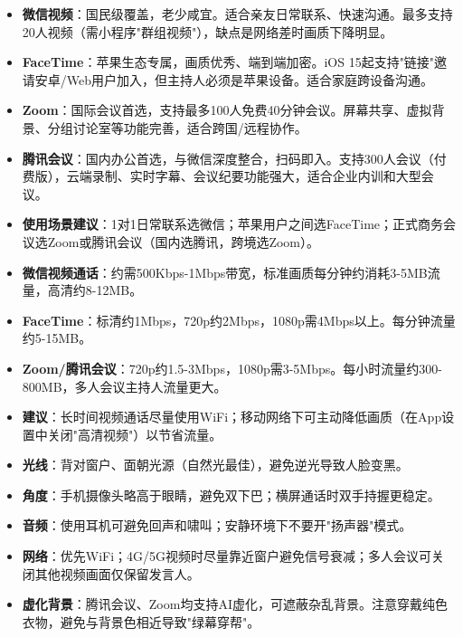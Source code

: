 \begin{itemize}
  \item \textbf{微信视频}：国民级覆盖，老少咸宜。适合亲友日常联系、快速沟通。最多支持20人视频（需小程序"群组视频"），缺点是网络差时画质下降明显。
  \item \textbf{FaceTime}：苹果生态专属，画质优秀、端到端加密。iOS 15起支持"链接"邀请安卓/Web用户加入，但主持人必须是苹果设备。适合家庭跨设备沟通。
  \item \textbf{Zoom}：国际会议首选，支持最多100人免费40分钟会议。屏幕共享、虚拟背景、分组讨论室等功能完善，适合跨国/远程协作。
  \item \textbf{腾讯会议}：国内办公首选，与微信深度整合，扫码即入。支持300人会议（付费版），云端录制、实时字幕、会议纪要功能强大，适合企业内训和大型会议。
  \item \textbf{使用场景建议}：1对1日常联系选微信；苹果用户之间选FaceTime；正式商务会议选Zoom或腾讯会议（国内选腾讯，跨境选Zoom）。
\end{itemize}


\begin{itemize}
  \item \textbf{微信视频通话}：约需500Kbps-1Mbps带宽，标准画质每分钟约消耗3-5MB流量，高清约8-12MB。
  \item \textbf{FaceTime}：标清约1Mbps，720p约2Mbps，1080p需4Mbps以上。每分钟流量约5-15MB。
  \item \textbf{Zoom/腾讯会议}：720p约1.5-3Mbps，1080p需3-5Mbps。每小时流量约300-800MB，多人会议主持人流量更大。
  \item \textbf{建议}：长时间视频通话尽量使用WiFi；移动网络下可主动降低画质（在App设置中关闭"高清视频"）以节省流量。
\end{itemize}


\begin{itemize}
  \item \textbf{光线}：背对窗户、面朝光源（自然光最佳），避免逆光导致人脸变黑。
  \item \textbf{角度}：手机摄像头略高于眼睛，避免双下巴；横屏通话时双手持握更稳定。
  \item \textbf{音频}：使用耳机可避免回声和啸叫；安静环境下不要开"扬声器"模式。
  \item \textbf{网络}：优先WiFi；4G/5G视频时尽量靠近窗户避免信号衰减；多人会议可关闭其他视频画面仅保留发言人。
  \item \textbf{虚化背景}：腾讯会议、Zoom均支持AI虚化，可遮蔽杂乱背景。注意穿戴纯色衣物，避免与背景色相近导致"绿幕穿帮"。
\end{itemize}

